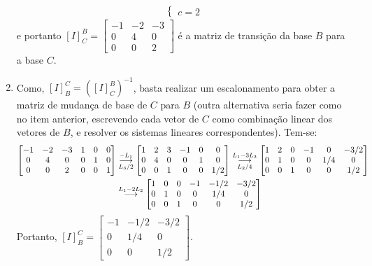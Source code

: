 \documentclass[12pt,a4paper]{article}
\newcommand{\grstep}[2][\relax]{%
   \ensuremath{\mathrel{
       {\mathop{\longrightarrow}\limits^{#2\mathstrut}_{
                                     \begin{subarray}{l} #1 \end{subarray}}}}}}
\begin{document}
\begin{ExerciseList}
\begin{enumerate}
\begin{align*}
\begin{cases}
c=2
\end{cases}
\end{align*}
e portanto $[I]^B_C =
\begin{bmatrix}
-1 & -2 & -3 \\
 0 &  4 &  0 \\
 0 &  0 &  2
\end{bmatrix}$ é a matriz de transição da base $B$ para a base $C$.
\item Como, $[I]^C_B = \left([I]^B_C\right)^{-1}$, basta realizar um escalonamento para obter a matriz de mudança de base de $C$ para $B$ (outra alternativa seria fazer como no item anterior, escrevendo cada vetor de $C$ como combinação linear dos vetores de $B$, e resolver os sistemas lineares correspondentes). Tem-se:
\begin{align*}
\begin{bmatrix}
-1 & -2 & -3 & 1 & 0 & 0\\
 0 &  4 &  0 & 0 & 1 & 0 \\
 0 &  0 &  2 & 0 & 0 & 1
\end{bmatrix}
& \grstep[L_3/2]{ -L_1 }
\begin{bmatrix}
1 & 2 & 3 & -1 & 0 & 0\\
0 & 4 & 0 &  0 & 1 & 0 \\
0 & 0 & 1 &  0 & 0 & 1/2
\end{bmatrix}
\grstep[L_2/4]{L_1-3L_3}
\begin{bmatrix}
1 & 2 & 0 & -1 & 0 & -3/2 \\
0 & 1 & 0 &  0 & 1/4 & 0 \\
0 & 0 & 1 &  0 & 0 & 1/2
\end{bmatrix} \\
& \grstep{ L_1-2L_2 }
\begin{bmatrix}
1 & 0 & 0 & -1 & -1/2 & -3/2 \\
0 & 1 & 0 &  0 & 1/4 & 0 \\
0 & 0 & 1 &  0 & 0 & 1/2
\end{bmatrix}
\end{align*}
Portanto, $[I]^C_B =
\begin{bmatrix}
-1 & -1/2 & -3/2 \\
 0 &  1/4 &  0 \\
 0 &  0 &  1/2
\end{bmatrix}$.


\end{enumerate}
\end{ExerciseList}
\end{document}
